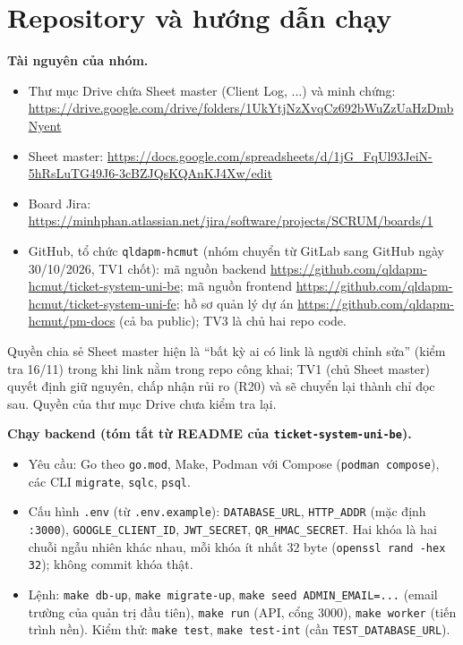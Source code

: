 \chapter{Repository và hướng dẫn chạy}
\label{app:repository}

\textbf{Tài nguyên của nhóm.}
\begin{itemize}
  \item Thư mục Drive chứa Sheet master (Client Log, ...) và minh chứng: \url{https://drive.google.com/drive/folders/1UkYtjNzXvqCz692bWuZzUaHzDmbNyent}
  \item Sheet master: \url{https://docs.google.com/spreadsheets/d/1jG_FqUl93JeiN-5hRsLuTG49J6-3cBZJQsKQAnKJ4Xw/edit}
  \item Board Jira: \url{https://minhphan.atlassian.net/jira/software/projects/SCRUM/boards/1}
  \item GitHub, tổ chức \texttt{qldapm-hcmut} (nhóm chuyển từ GitLab sang GitHub ngày 30/10/2026, TV1 chốt): mã nguồn backend \url{https://github.com/qldapm-hcmut/ticket-system-uni-be}; mã nguồn frontend \url{https://github.com/qldapm-hcmut/ticket-system-uni-fe}; hồ sơ quản lý dự án \url{https://github.com/qldapm-hcmut/pm-docs} (cả ba public); TV3 là chủ hai repo code.
\end{itemize}

Quyền chia sẻ Sheet master hiện là \enquote{bất kỳ ai có link là người chỉnh sửa} (kiểm tra 16/11) trong khi link nằm trong repo công khai; TV1 (chủ Sheet master) quyết định giữ nguyên, chấp nhận rủi ro (R20) và sẽ chuyển lại thành chỉ đọc sau. Quyền của thư mục Drive chưa kiểm tra lại.

\textbf{Chạy backend (tóm tắt từ README của \texttt{ticket-system-uni-be}).}
\begin{itemize}
  \item Yêu cầu: Go theo \texttt{go.mod}, Make, Podman với Compose (\texttt{podman compose}), các CLI \texttt{migrate}, \texttt{sqlc}, \texttt{psql}.
  \item Cấu hình \texttt{.env} (từ \texttt{.env.example}): \texttt{DATABASE\_URL}, \texttt{HTTP\_ADDR} (mặc định \texttt{:3000}), \texttt{GOOGLE\_CLIENT\_ID}, \texttt{JWT\_SECRET}, \texttt{QR\_HMAC\_SECRET}. Hai khóa là hai chuỗi ngẫu nhiên khác nhau, mỗi khóa ít nhất 32 byte (\texttt{openssl rand -hex 32}); không commit khóa thật.
  \item Lệnh: \texttt{make db-up}, \texttt{make migrate-up}, \texttt{make seed ADMIN\_EMAIL=...} (email trường của quản trị đầu tiên), \texttt{make run} (API, cổng 3000), \texttt{make worker} (tiến trình nền). Kiểm thử: \texttt{make test}, \texttt{make test-int} (cần \texttt{TEST\_DATABASE\_URL}).
\end{itemize}


